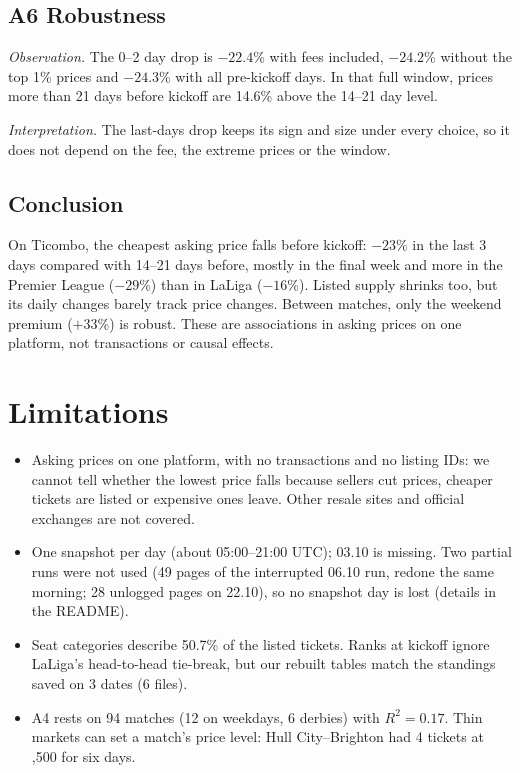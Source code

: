 \documentclass[11pt,a4paper]{article}
\newcommand{\eur}{\texteuro}
\newcommand{\obs}{\par\noindent\textit{Observation.} }
\newcommand{\interp}{\par\noindent\textit{Interpretation.} }
\begin{document}
\subsection*{A6 Robustness}
\obs The 0--2 day drop is $-22.4$\% with fees included, $-24.2$\% without the top 1\% prices and $-24.3$\% with all pre-kickoff days. In that full window, prices more than 21 days before kickoff are 14.6\% above the 14--21 day level.
\interp The last-days drop keeps its sign and size under every choice, so it does not depend on the fee, the extreme prices or the window.

\subsection*{Conclusion}
On Ticombo, the cheapest asking price falls before kickoff: $-23$\% in the last 3 days compared with 14--21 days before, mostly in the final week and more in the Premier League ($-29$\%) than in LaLiga ($-16$\%). Listed supply shrinks too, but its daily changes barely track price changes. Between matches, only the weekend premium ($+33$\%) is robust. These are associations in asking prices on one platform, not transactions or causal effects.

\section{Limitations}
\begin{itemize}
\item Asking prices on one platform, with no transactions and no listing IDs: we cannot tell whether the lowest price falls because sellers cut prices, cheaper tickets are listed or expensive ones leave. Other resale sites and official exchanges are not covered.
\item One snapshot per day (about 05:00--21:00 UTC); 03.10 is missing. Two partial runs were not used (49 pages of the interrupted 06.10 run, redone the same morning; 28 unlogged pages on 22.10), so no snapshot day is lost (details in the README).
\item Seat categories describe 50.7\% of the listed tickets. Ranks at kickoff ignore LaLiga's head-to-head tie-break, but our rebuilt tables match the standings saved on 3 dates (6 files).
\item A4 rests on 94 matches (12 on weekdays, 6 derbies) with $R^2=0.17$. Thin markets can set a match's price level: Hull City--Brighton had 4 tickets at \eur 1,500 for six days.
\end{itemize}
\end{document}
